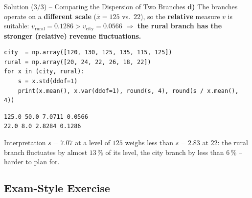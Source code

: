 \documentclass[aspectratio=169,11pt]{beamer}
\begin{document}
\begin{frame}[fragile]{Solution (3/3) -- Comparing the Dispersion of Two Branches}
  \textbf{d)} The branches operate on a \textbf{different scale} ($\bar{x} = 125$ vs.\ $22$), so the
  \textbf{relative} measure $v$ is suitable: $v_{\text{rural}} = 0.1286 > v_{\text{city}} = 0.0566$
  $\Rightarrow$ \textbf{the rural branch has the stronger (relative) revenue fluctuations.}
\begin{lstlisting}
city  = np.array([120, 130, 125, 135, 115, 125])
rural = np.array([20, 24, 22, 26, 18, 22])
for x in (city, rural):
    s = x.std(ddof=1)
    print(x.mean(), x.var(ddof=1), round(s, 4), round(s / x.mean(), 4))
\end{lstlisting}
\begin{lstlisting}[style=Pyout,aboveskip=2pt,belowskip=2pt]
125.0 50.0 7.0711 0.0566
22.0 8.0 2.8284 0.1286
\end{lstlisting}
  \begin{alertblock}{Interpretation}
    $s = 7.07$ at a level of $125$ weighs less than $s = 2.83$ at $22$: the rural branch fluctuates
    by almost $13\,\%$ of its level, the city branch by less than $6\,\%$ -- harder to plan for.
  \end{alertblock}
\end{frame}

\subsection{Exam-Style Exercise}
\end{document}

